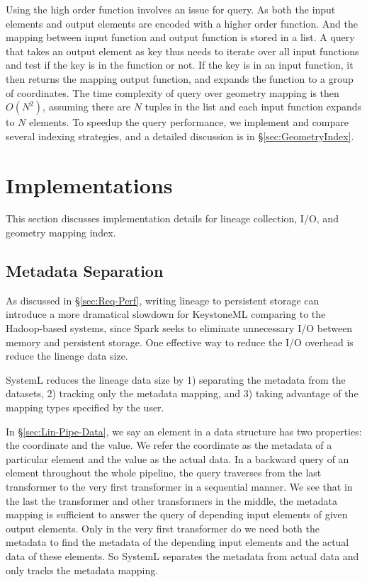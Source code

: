 \documentclass{sig-alternate}
\begin{document}
Using the high order function involves an issue for query. 
As both the input elements and output elements are encoded with a higher order function. 
And the mapping between input function and output function is stored in a list. 
A query that takes an output element as key thus needs to iterate over all input functions and test if the key is in the function or not.
If the key is in an input function, it then returns the mapping output function, and expands the function to a group of coordinates.
The time complexity of query over geometry mapping is then $O(N^2)$, assuming there are $N$ tuples in the list and each input function expands to $N$ elements.
To speedup the query performance, we implement and compare several indexing strategies, and a detailed discussion is in \S\ref{sec:GeometryIndex}.


\section{Implementations}
\label{sec:Impl}
This section discusses implementation details for lineage collection, I/O, and geometry mapping index.

\subsection{Metadata Separation}
As discussed in \S\ref{sec:Req-Perf}, writing lineage to persistent storage can introduce a more dramatical slowdown for KeystoneML comparing
to the Hadoop-based systems, since Spark seeks to eliminate unnecessary I/O between memory and persistent storage.
One effective way to reduce the I/O overhead is reduce the lineage data size.

SystemL reduces the lineage data size by 1) separating the metadata from the datasets, 2) tracking only the metadata mapping, 
and 3) taking advantage of the mapping types specified by the user.

In \S\ref{sec:Lin-Pipe-Data}, we say an element in a data structure has two properties: the coordinate and the value.
We refer the coordinate as the metadata of a particular element and the value as the actual data. 
In a backward query of an element throughout the whole pipeline, the query traverses from the last transformer
to the very first transformer in a sequential manner. 
We see that in the last the transformer and other transformers in the middle, the metadata mapping is sufficient to answer
the query of depending input elements of given output elements. Only in the very first transformer do we need both the metadata
to find the metadata of the depending input elements and the actual data of these elements.
So SystemL separates the metadata from actual data and only tracks the metadata mapping.
\end{document}
